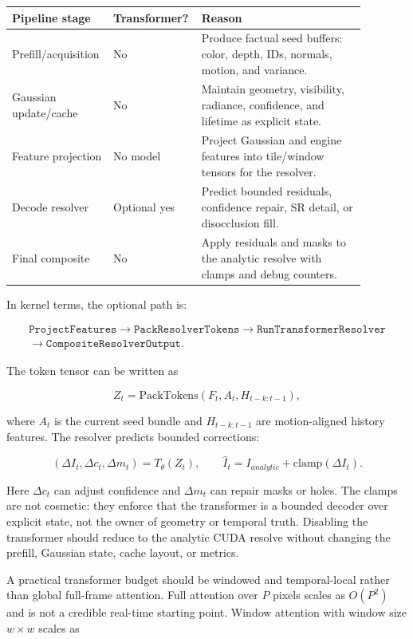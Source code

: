 \documentclass[11pt]{article}
\begin{document}
\begin{center}
\small
\begin{tabular}{p{0.25\linewidth}p{0.18\linewidth}p{0.45\linewidth}}
\toprule
Pipeline stage & Transformer? & Reason \\
\midrule
Prefill/acquisition & No & Produce factual seed buffers: color, depth, IDs, normals, motion, and variance. \\
Gaussian update/cache & No & Maintain geometry, visibility, radiance, confidence, and lifetime as explicit state. \\
Feature projection & No model & Project Gaussian and engine features into tile/window tensors for the resolver. \\
Decode resolver & Optional yes & Predict bounded residuals, confidence repair, SR detail, or disocclusion fill. \\
Final composite & No & Apply residuals and masks to the analytic resolve with clamps and debug counters. \\
\bottomrule
\end{tabular}
\end{center}

In kernel terms, the optional path is:

\[
\begin{gathered}
\texttt{ProjectFeatures}
\rightarrow \texttt{PackResolverTokens}
\rightarrow \texttt{RunTransformerResolver}\\
\rightarrow \texttt{CompositeResolverOutput}.
\end{gathered}
\]

The token tensor can be written as

\[
  Z_t = \mathrm{PackTokens}(F_t,A_t,H_{t-k:t-1}),
\]

where $A_t$ is the current seed bundle and $H_{t-k:t-1}$ are motion-aligned
history features. The resolver predicts bounded corrections:

\[
  (\Delta I_t,\Delta c_t,\Delta m_t)=T_\theta(Z_t),
  \qquad
  \hat I_t = I_{analytic} + \mathrm{clamp}(\Delta I_t).
\]

Here $\Delta c_t$ can adjust confidence and $\Delta m_t$ can repair masks or
holes. The clamps are not cosmetic: they enforce that the transformer is a
bounded decoder over explicit state, not the owner of geometry or temporal
truth. Disabling the transformer should reduce to the analytic CUDA resolve
without changing the prefill, Gaussian state, cache layout, or metrics.

A practical transformer budget should be windowed and temporal-local rather
than global full-frame attention. Full attention over $P$ pixels scales as
$O(P^2)$ and is not a credible real-time starting point. Window attention with
window size $w\times w$ scales as
\end{document}
